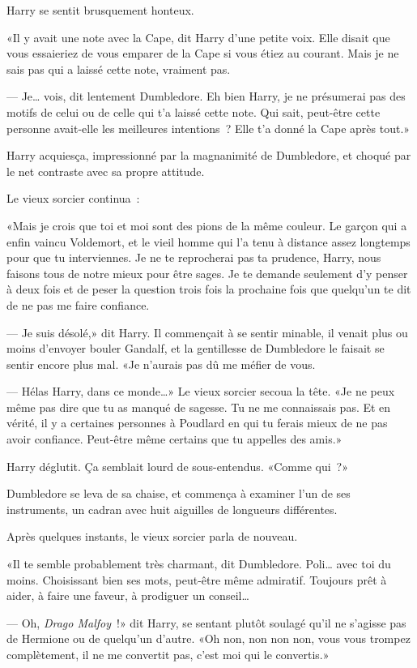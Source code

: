 Harry se sentit brusquement honteux.

«Il y avait une note avec la Cape, dit Harry d'une petite voix. Elle disait que vous essaieriez de vous emparer de la Cape si vous étiez au courant. Mais je ne sais pas qui a laissé cette note, vraiment pas.

--- Je… vois, dit lentement Dumbledore. Eh bien Harry, je ne présumerai pas des motifs de celui ou de celle qui t'a laissé cette note. Qui sait, peut-être cette personne avait-elle les meilleures intentions~? Elle t'a donné la Cape après tout.»

Harry acquiesça, impressionné par la magnanimité de Dumbledore, et choqué par le net contraste avec sa propre attitude.

Le vieux sorcier continua~:

«Mais je crois que toi et moi sont des pions de la même couleur. Le garçon qui a enfin vaincu Voldemort, et le vieil homme qui l'a tenu à distance assez longtemps pour que tu interviennes. Je ne te reprocherai pas ta prudence, Harry, nous faisons tous de notre mieux pour être sages. Je te demande seulement d'y penser à deux fois et de peser la question trois fois la prochaine fois que quelqu'un te dit de ne pas me faire confiance.

--- Je suis désolé,» dit Harry. Il commençait à se sentir minable, il venait plus ou moins d'envoyer bouler Gandalf, et la gentillesse de Dumbledore le faisait se sentir encore plus mal. «Je n'aurais pas dû me méfier de vous.

--- Hélas Harry, dans ce monde…» Le vieux sorcier secoua la tête. «Je ne peux même pas dire que tu as manqué de sagesse. Tu ne me connaissais pas. Et en vérité, il y a certaines personnes à Poudlard en qui tu ferais mieux de ne pas avoir confiance. Peut-être même certains que tu appelles des amis.»

Harry déglutit. Ça semblait lourd de sous-entendus. «Comme qui~?»

Dumbledore se leva de sa chaise, et commença à examiner l'un de ses instruments, un cadran avec huit aiguilles de longueurs différentes.

Après quelques instants, le vieux sorcier parla de nouveau.

«Il te semble probablement très charmant, dit Dumbledore. Poli… avec toi du moins. Choisissant bien ses mots, peut-être même admiratif. Toujours prêt à aider, à faire une faveur, à prodiguer un conseil…

--- Oh, \emph{Drago Malfoy}~!» dit Harry, se sentant plutôt soulagé qu'il ne s'agisse pas de Hermione ou de quelqu'un d'autre. «Oh non, non non non, vous vous trompez complètement, il ne me convertit pas, c'est moi qui le convertis.»

